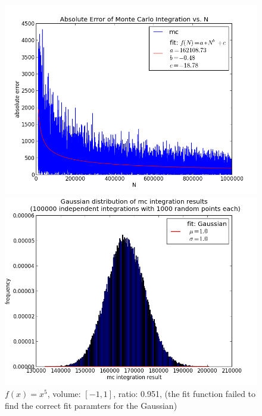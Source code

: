 \documentclass[12pt,a4paper,titlepage]{article}
\begin{document}
\begin{appendix}
\begin{figure}
\begin{minipage}[b]{\linewidth}
	\end{minipage}
	\label{fig:linear}
\end{figure}
\begin{figure}
	\centering
	\caption{$f(x)=x^5$, volume: $[-1,1]$, ratio: 0.951, (the fit function failed to find the correct fit paramters for the Gaussian)}
	\begin{minipage}[b]{\linewidth}
		\centering
		\includegraphics[width=\linewidth]{Plots/x5}
	\end{minipage}
	\begin{minipage}[b]{\linewidth}
		\centering
		\includegraphics[width=\linewidth]{Plots/x5_HIST}
	\end{minipage}
	\label{fig:linear}
\end{figure}

\end{appendix}
\end{document}

